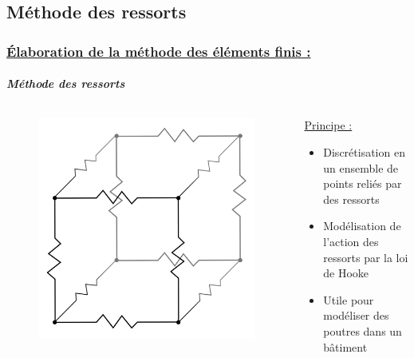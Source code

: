 \documentclass[10pt]{beamer}
\begin{document}
	\subsection{M\'ethode des ressorts}
	\begin{frame}
		\frametitle{\uline{\'Elaboration de la m\'ethode des \'el\'ements finis :}}
		\framesubtitle{\textit{M\'ethode des ressorts}}
		\begin{columns}[t]
 			\begin{column}{5cm}
 				\begin{figure}
 				 	\includegraphics[scale=0.50]{Images/cubeFinal.png}
 				\end{figure}
			\end{column}
			\begin{column}{5cm}
				\begin{block}{}
					\uline{Principe :}
					\begin{itemize}
						\item Discr\'etisation en un ensemble de points reli\'es par des ressorts
						\item Mod\'elisation de l'action des ressorts par la loi de Hooke
						\item Utile pour mod\'eliser des poutres dans un b\^atiment
					\end{itemize}
				\end{block}
  			\end{column}
 		\end{columns}
	\end{frame}
\end{document}
